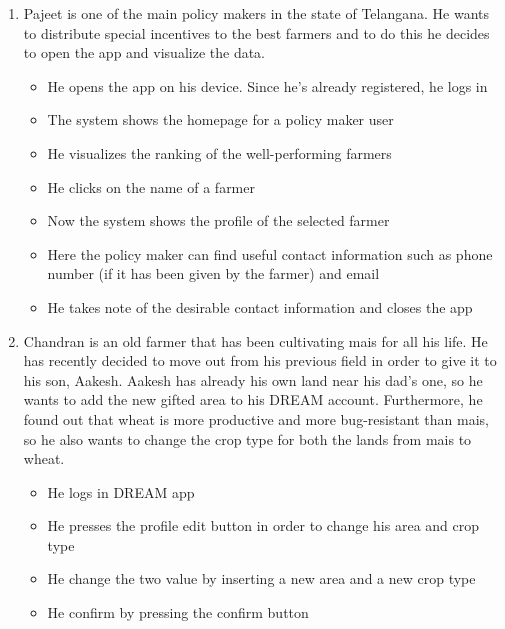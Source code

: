 \documentclass[table, 12pt]{article}
\begin{document}
\begin{enumerate}
    \item Pajeet is one of the main policy makers in the state of Telangana.
    He wants to distribute special incentives to the best farmers and to do this he decides
    to open the app and visualize the data.
    \begin{itemize}
        \item He opens the app on his device. Since he's already registered, he logs in
        \item The system shows the homepage for a policy maker user
        \item He visualizes the ranking of the well-performing farmers
        \item He clicks on the name of a farmer
        \item Now the system shows the profile of the selected farmer
        \item Here the policy maker can find useful contact information such as phone number (if it has been given by the farmer) and email
        \item He takes note of the desirable contact information and closes the app
    \end{itemize}

    \item Chandran is an old farmer that has been cultivating mais for all his life. He has recently decided to move out from his previous field in order to give it to his son, Aakesh. Aakesh has already his own land near his dad's one, so he wants to add the new gifted area to his DREAM account. Furthermore, he found out that wheat is more productive and more bug-resistant than mais, so he also wants to change the crop type for both the lands from mais to wheat.
    \begin{itemize}
        \item He logs in DREAM app
        \item He presses the profile edit button in order to change his area and crop type
        \item He change the two value by inserting a new area and a new crop type
        \item He confirm by pressing the confirm button
    \end{itemize}


\end{enumerate}
\end{document}
